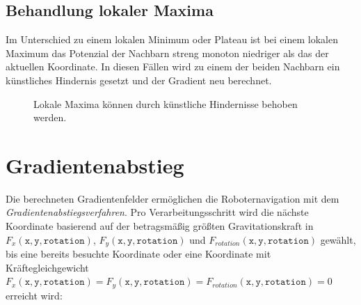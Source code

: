 \subsection{Behandlung lokaler Maxima}

Im Unterschied zu einem lokalen Minimum oder Plateau ist bei einem lokalen Maximum das Potenzial der Nachbarn streng monoton niedriger als das der aktuellen Koordinate.
In diesen Fällen wird zu einem der beiden Nachbarn ein künstliches Hindernis gesetzt und der Gradient neu berechnet.
\begin{figure}[H]
	\centering
	\footnotesize
	\centerline{\resizebox{0.9\linewidth}{!}{}}
	\caption{Lokale Maxima können durch künstliche Hindernisse behoben werden.}
\end{figure}


\section{Gradientenabstieg}

Die berechneten Gradientenfelder ermöglichen die Roboternavigation mit dem \textit{Gradientenabstiegsverfahren}. Pro Verarbeitungsschritt wird die nächste Koordinate basierend auf der betragsmäßig größten Gravitationskraft in $F_{x}(\texttt{x}, \texttt{y}, \texttt{rotation})$, $F_{y}(\texttt{x}, \texttt{y}, \texttt{rotation})$ und $F_{rotation}(\texttt{x}, \texttt{y}, \texttt{rotation})$ gewählt, bis eine bereits besuchte Koordinate oder eine Koordinate mit Kräftegleichgewicht $F_{x}(\texttt{x}, \texttt{y}, \texttt{rotation}) = F_{y}(\texttt{x}, \texttt{y}, \texttt{rotation}) = F_{rotation}(\texttt{x}, \texttt{y}, \texttt{rotation}) = 0$ erreicht wird:

